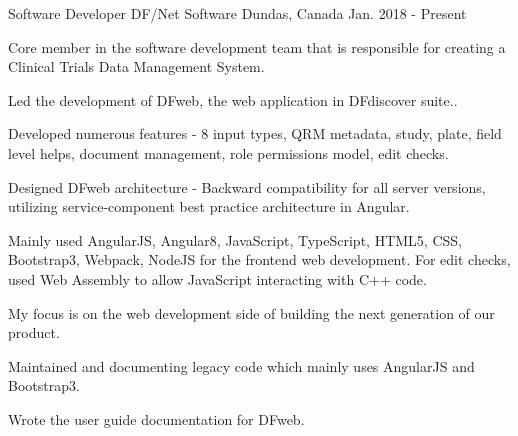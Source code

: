 

\begin{cventries}

  \cventry
{Software Developer} %
{DF/Net Software} %
{Dundas, Canada} %
{Jan. 2018 - Present} %
{\begin{cvitems}
		\item
		{Core member in the software development team that is responsible for creating a Clinical Trials Data Management System.}
		\item
		{Led the development of DFweb, the web application in DFdiscover suite..}
		\item
		{Developed numerous features - 8 input types, QRM metadata, study, plate, field level helps, document management, role permissions model, edit checks.}
		\item
		{Designed DFweb architecture - Backward compatibility for all server versions, utilizing service-component best practice architecture in Angular.}
		\item
		{Mainly used AngularJS, Angular8, JavaScript, TypeScript, HTML5, CSS, Bootstrap3, Webpack, NodeJS for the frontend web development. For edit checks, used Web Assembly to allow JavaScript interacting with C++ code.}
		\item
		{My focus is on the web development side of building the next generation of our product.}
		\item
		{Maintained and documenting legacy code which mainly uses AngularJS and Bootstrap3. }
		\item
		{Wrote the user guide documentation for DFweb.}
	\end{cvitems}
}
	



\end{cventries}
